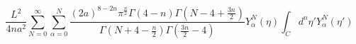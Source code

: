 \begin{equation}
\frac{L^2}{4na^2}\sum_{N=0}^{\infty}\sum_{\alpha = 0}^N
\frac{(2a)^{8-2n}{\pi}^{\frac{n}{2}}\Gamma(4-n)\Gamma(N-4+\frac{3n}{2})}{
\Gamma(N+4-\frac{n}{2})\Gamma(\frac{3n}{2}-4)}Y_{\alpha}^N({\eta})\int_Cd^n\eta'Y_{\alpha}^N(\eta')
\end{equation}

